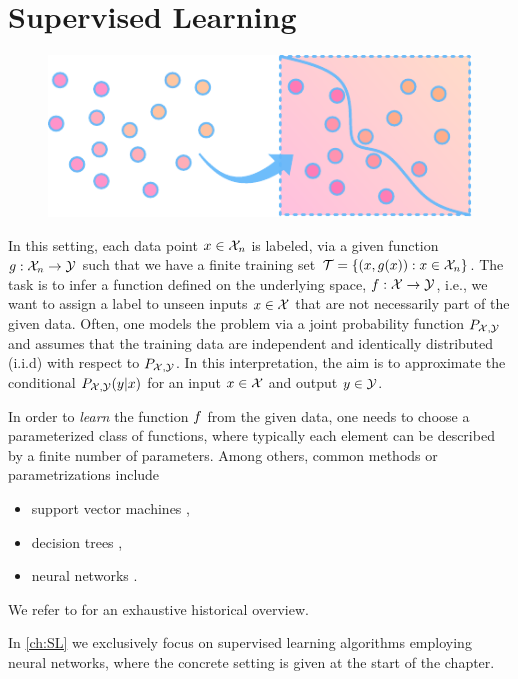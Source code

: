 \section{Supervised Learning}\label{sec:PSL}
\begin{figure}
\centering
\includegraphics[width=.5\textwidth]{atelier/paradigms/SL.pdf}
\end{figure}
%
In this setting, each data point $x\in\mathcal{X}_n$ is labeled, via a given function $g:\mathcal{X}_n\to\mathcal{\mathcal{Y}}$ such that we have a finite training set $\mathcal{T} = \{(x,g(x)): x\in\mathcal{X}_n\}$. The task is to infer a function defined on the underlying space, $f:\mathcal{X} \to\mathcal{\mathcal{Y}}$, i.e., we want to assign a label to unseen inputs $x\in\mathcal{X}$ that are not necessarily part of the given data. Often, one models the problem via a joint probability function $P_{\mathcal{X},\mathcal{\mathcal{Y}}}$ and assumes that the training data are independent and identically distributed (i.i.d) with respect to $P_{\mathcal{X},\mathcal{\mathcal{Y}}}$. In this interpretation, the aim is to approximate the conditional $P_{\mathcal{X},\mathcal{\mathcal{Y}}}(y|x)$ for an input $x\in\mathcal{X}$ and output $y\in\mathcal{\mathcal{Y}}$. 

In order to \emph{learn} the function $f$ from the given data, one needs to choose a parameterized class of functions, where typically each element can be described by a finite number of parameters. Among others, common methods or parametrizations include
%
\begin{itemize}
\item support vector machines \cite{cortes1995support, scholkopf2005support},
\item decision trees \cite{morgan1963problems, Brei},
\item neural networks \cite{Turing,rosenblatt1958perceptron, minsky1969introduction}.
\end{itemize}
%
We refer to \cite{SCHMIDHUBER201585} for an exhaustive historical overview.

In \cref{ch:SL} we exclusively focus on supervised learning algorithms employing neural networks, where the concrete setting is given at the start of the chapter.
%
%
%
